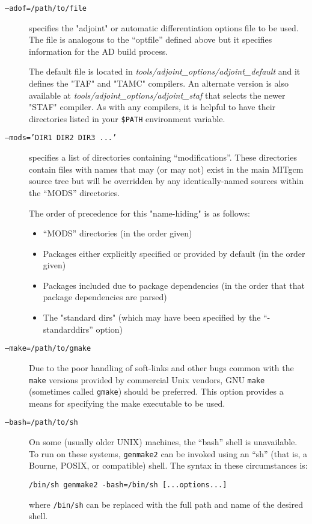 \begin{description}
\item[\texttt{--adof=/path/to/file}] specifies the "adjoint" or
  automatic differentiation options file to be used.  The file is
  analogous to the ``optfile'' defined above but it specifies
  information for the AD build process.
  
  The default file is located in {\em
    tools/adjoint\_options/adjoint\_default} and it defines the "TAF"
  and "TAMC" compilers.  An alternate version is also available at
  {\em tools/adjoint\_options/adjoint\_staf} that selects the newer
  "STAF" compiler.  As with any compilers, it is helpful to have their
  directories listed in your {\tt \$PATH} environment variable.
  
\item[\texttt{--mods='DIR1 DIR2 DIR3 ...'}] specifies a list of
  directories containing ``modifications''.  These directories contain
  files with names that may (or may not) exist in the main MITgcm
  source tree but will be overridden by any identically-named sources
  within the ``MODS'' directories.
  
  The order of precedence for this "name-hiding" is as follows:
  \begin{itemize}
  \item ``MODS'' directories (in the order given)
  \item Packages either explicitly specified or provided by default
    (in the order given)
  \item Packages included due to package dependencies (in the order
    that that package dependencies are parsed)
  \item The "standard dirs" (which may have been specified by the
    ``-standarddirs'' option)
  \end{itemize}
  
\item[\texttt{--make=/path/to/gmake}] Due to the poor handling of
  soft-links and other bugs common with the \texttt{make} versions
  provided by commercial Unix vendors, GNU \texttt{make} (sometimes
  called \texttt{gmake}) should be preferred.  This option provides a
  means for specifying the make executable to be used.
  
\item[\texttt{--bash=/path/to/sh}] On some (usually older UNIX)
  machines, the ``bash'' shell is unavailable.  To run on these
  systems, \texttt{genmake2} can be invoked using an ``sh'' (that is,
  a Bourne, POSIX, or compatible) shell.  The syntax in these
  circumstances is:
  \begin{center}
    \texttt{/bin/sh genmake2 -bash=/bin/sh [...options...]}
  \end{center}
  where \texttt{/bin/sh} can be replaced with the full path and name
  of the desired shell.

\end{description}




